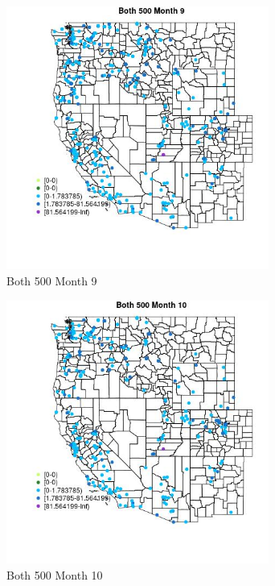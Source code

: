 \begin{figure} 
\centering  
\includegraphics[width=0.77\textwidth]{Code_Outputs/Report_ML_input_PM25_Step4_part_e_de_duplicated_aveswNAs_MapObsMo9Both_500.jpg} 
\caption{\label{fig:Report_ML_input_PM25_Step4_part_e_de_duplicated_aveswNAsMapObsMo9Both_500}Both 500 Month 9} 
\end{figure} 
 

\begin{figure} 
\centering  
\includegraphics[width=0.77\textwidth]{Code_Outputs/Report_ML_input_PM25_Step4_part_e_de_duplicated_aveswNAs_MapObsMo10Both_500.jpg} 
\caption{\label{fig:Report_ML_input_PM25_Step4_part_e_de_duplicated_aveswNAsMapObsMo10Both_500}Both 500 Month 10} 
\end{figure} 
 

